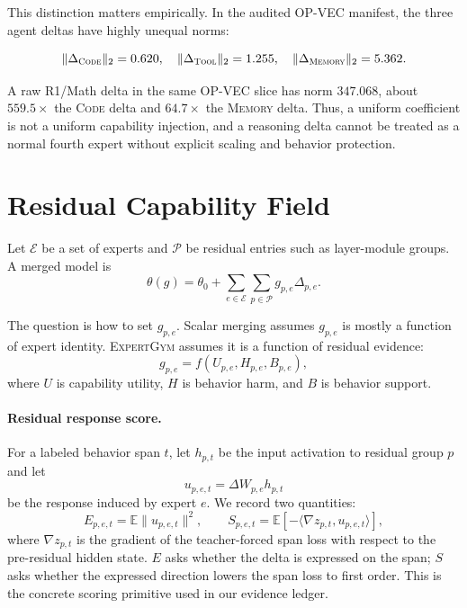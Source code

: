 \documentclass{article}
\newcommand{\method}{\textsc{ExpertGym}\xspace}
\newcommand{\tool}{\textsc{Tool}\xspace}
\newcommand{\memory}{\textsc{Memory}\xspace}
\newcommand{\code}{\textsc{Code}\xspace}
\begin{document}
This distinction matters empirically.  In the audited OP-VEC manifest, the three agent deltas have highly unequal norms:

\begin{equation}
    \|\Delta_{\code}\|_2=0.620,\quad
    \|\Delta_{\tool}\|_2=1.255,\quad
    \|\Delta_{\memory}\|_2=5.362.
\end{equation}

A raw R1/Math delta in the same OP-VEC slice has norm $347.068$, about $559.5\times$ the \code delta and $64.7\times$ the \memory delta.  Thus, a uniform coefficient is not a uniform capability injection, and a reasoning delta cannot be treated as a normal fourth expert without explicit scaling and behavior protection.

\section{Residual Capability Field}

Let $\mathcal{E}$ be a set of experts and $\mathcal{P}$ be residual entries such as layer-module groups.  A merged model is
\begin{equation}
    \theta(g)=\theta_0+\sum_{e\in\mathcal{E}}\sum_{p\in\mathcal{P}} g_{p,e}\Delta_{p,e}.
\end{equation}

The question is how to set $g_{p,e}$.  Scalar merging assumes $g_{p,e}$ is mostly a function of expert identity.  \method assumes it is a function of residual evidence:
\begin{equation}
    g_{p,e}=f(U_{p,e}, H_{p,e}, B_{p,e}),
\end{equation}
where $U$ is capability utility, $H$ is behavior harm, and $B$ is behavior support.

\paragraph{Residual response score.}
For a labeled behavior span $t$, let $h_{p,t}$ be the input activation to residual group $p$ and let
\begin{equation}
    u_{p,e,t}=\Delta W_{p,e}h_{p,t}
\end{equation}
be the response induced by expert $e$.  We record two quantities:
\begin{equation}
    E_{p,e,t}=\mathbb{E}\|u_{p,e,t}\|^2,\qquad
    S_{p,e,t}=\mathbb{E}[-\langle \nabla z_{p,t}, u_{p,e,t}\rangle],
\end{equation}
where $\nabla z_{p,t}$ is the gradient of the teacher-forced span loss with respect to the pre-residual hidden state.  $E$ asks whether the delta is expressed on the span; $S$ asks whether the expressed direction lowers the span loss to first order.  This is the concrete scoring primitive used in our evidence ledger.
\end{document}
